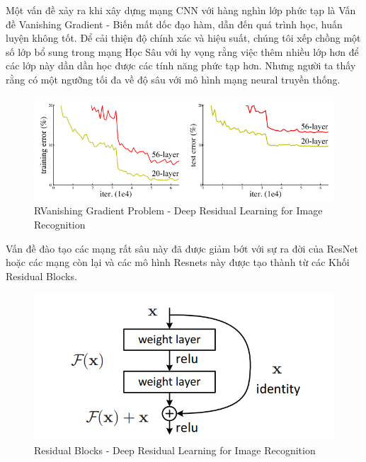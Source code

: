 \documentclass{article}
\begin{document}
	Một vấn đề xảy ra khi xây dựng mạng CNN với hàng nghìn lớp phức tạp là Vấn đề Vanishing Gradient - Biến mất dốc đạo hàm, dẫn đến quá trình học, huấn luyện không tốt. Để cải thiện độ chính xác và hiệu suất, chúng tôi xếp chồng một số lớp bổ sung trong mạng Học Sâu với hy vọng rằng việc thêm nhiều lớp hơn để các lớp này dần dần học được các tính năng phức tạp hơn. Nhưng người ta thấy rằng có một ngưỡng tối đa về độ sâu với mô hình mạng neural truyền thống.
	\begin{figure}[H]
		\centering
		\includegraphics[width=1\linewidth]{architecture/Vanishing_Gradient.png}
		\caption{RVanishing Gradient Problem - Deep Residual Learning for Image Recognition}
		\label{fig:writing-thesis}
	\end{figure}
	Vấn đề đào tạo các mạng rất sâu này đã được giảm bớt với sự ra đời của ResNet hoặc các mạng còn lại và các mô hình Resnets này được tạo thành từ các Khối Residual Blocks.
	\begin{figure}[H]
		\centering
		\includegraphics[width=1\linewidth]{architecture/residual_learning_building_block.png}
		\caption{Residual Blocks - Deep Residual Learning for Image Recognition}
		\label{fig:writing-thesis}
	\end{figure}
\end{document}

